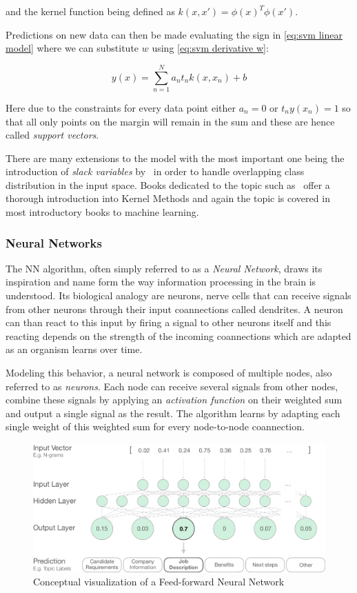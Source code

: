 and the kernel function being defined as $k(x, x') = \phi(x)^T \phi(x')$.

Predictions on new data can then be made evaluating the sign in \eqref{eq:svm linear model} where we can substitute $w$ using \eqref{eq:svm derivative w}:

\begin{equation}
	y(x) = \sum_{n=1}^N a_n t_n k(x, x_n) + b
\end{equation}

Here due to the constraints for every data point either $a_n = 0$ or $t_n y(x_n) = 1$ so that all only points on the margin will remain in the sum and these are hence called \emph{support vectors}.

There are many extensions to the model with the most important one being the introduction of \emph{slack variables} by~\cite{Cortes:aa} in order to handle overlapping class distribution in the input space. Books dedicated to the topic such as~\cite{Shawe-Taylor:2004aa} offer a thorough introduction into Kernel Methods and again the topic is covered in most introductory books to machine learning.

\subsubsection{Neural Networks}
\label{subs:Neural Networks}

The \gls{NN} algorithm, often simply referred to as a \emph{Neural Network}, draws its inspiration and name form the way information processing in the brain is understood. Its biological analogy are neurons, nerve cells that can receive signals from other neurons through their input coannections called dendrites. A neuron can than react to this input by firing a signal to other neurons itself and this reacting depends on the strength of the incoming coannections which are adapted as an organism learns over time.

Modeling this behavior, a neural network is composed of multiple nodes, also referred to as \emph{neurons}. Each node can receive several signals from other nodes, combine these signals by applying an \emph{activation function} on their weighted sum and output a single signal as the result. The algorithm learns by adapting each single weight of this weighted sum for every node-to-node coannection.

\begin{figure}[h]
  \centering
  \includegraphics[width=1\textwidth]{img/NN}
  \caption{Conceptual visualization of a Feed-forward Neural Network}
  \label{fig:NN}
\end{figure}

